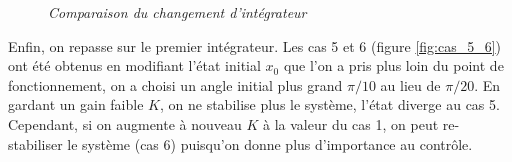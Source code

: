\documentclass[11pt,french]{article} %
\begin{document}
\begin{figure}[H]%
    \centering
		\noindent{}%
		\caption{\textit{Comparaison du changement d'intégrateur}}%
		\label{fig:cas_3_4}%
\end{figure}
\vspace{0.5cm}

Enfin, on repasse sur le premier intégrateur. Les cas 5 et 6 (figure \ref{fig:cas_5_6}) ont été obtenus en modifiant l'état initial $x_0$ que l'on a pris plus loin du point de fonctionnement, on a choisi un angle initial plus grand $\pi/10$ au lieu de $\pi/20$. En gardant un gain faible $K$, on ne stabilise plus le système, l'état diverge au cas 5. Cependant, si on augmente à nouveau $K$ à la valeur du cas 1, on peut re-stabiliser le système (cas 6) puisqu'on donne plus d'importance au contrôle. \\
\end{document}
